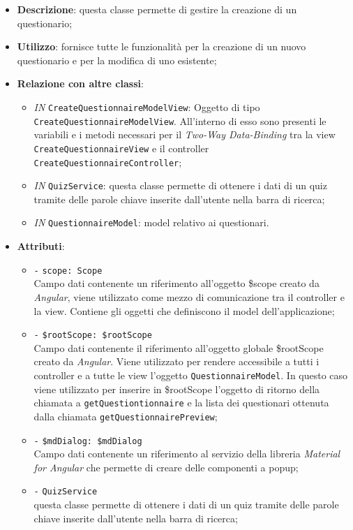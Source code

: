 \begin{itemize}
	\item \textbf{Descrizione}: questa classe permette di gestire la creazione di un questionario;
	\item \textbf{Utilizzo}: fornisce tutte le funzionalità per la creazione di un nuovo questionario e per la modifica di uno esistente;
	\item \textbf{Relazione con altre classi}:
	\begin{itemize}
		\item \textit{IN} \texttt{CreateQuestionnaireModelView}: Oggetto di tipo \texttt{CreateQuestionnaireModelView}. All'interno di esso sono presenti le variabili e i metodi necessari per il \textit{Two-Way Data-Binding} tra la view \texttt{CreateQuestionnaireView} e il controller \texttt{CreateQuestionnaireController}; 
		\item \textit{IN} \texttt{QuizService}: questa classe permette di ottenere i dati di un quiz tramite delle parole chiave inserite dall'utente nella barra di ricerca;
		\item \textit{IN} \texttt{QuestionnaireModel}: model relativo ai questionari.
	\end{itemize}
	\item \textbf{Attributi}:
	\begin{itemize}
		\item \texttt{-} \texttt{scope: Scope} \\
		Campo dati contenente un riferimento all’oggetto \$scope creato da \textit{Angular}, viene utilizzato come mezzo di comunicazione tra il controller e la view. Contiene gli oggetti che definiscono il model dell’applicazione;
		\item \texttt{-} \texttt{\$rootScope: \$rootScope} \\
		Campo dati contenente il riferimento all'oggetto globale \$rootScope creato da \textit{Angular}. Viene utilizzato per rendere accessibile a tutti i controller e a tutte le view l'oggetto \texttt{QuestionnaireModel}. In questo caso viene utilizzato per inserire in \$rootScope l'oggetto di ritorno della chiamata a \texttt{getQuestiontionnaire} e la lista dei questionari ottenuta dalla chiamata \texttt{getQuestionnairePreview};
		\item \texttt{-} \texttt{\$mdDialog: \$mdDialog} \\
		Campo dati contenente un riferimento al servizio della libreria \textit{Material for Angular} che permette di creare delle componenti a popup;
		\item \texttt{-} \texttt{QuizService} \\ questa classe permette di ottenere i dati di un quiz tramite delle parole chiave inserite dall'utente nella barra di ricerca;


\end{itemize}
\end{itemize}
